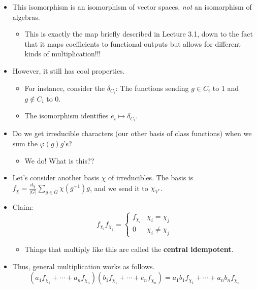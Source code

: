 \documentclass[../notes.tex]{subfiles}
\begin{document}
\begin{itemize}
\begin{itemize}
        \item This isomorphism is an isomorphism of vector spaces, \emph{not} an isomorphism of algebras.
        \begin{itemize}
            \item This is exactly the map briefly described in Lecture 3.1, down to the fact that it maps coefficients to functional outputs but allows for different kinds of multiplication!!!
        \end{itemize}
        \item However, it still has cool properties.
        \begin{itemize}
            \item For instance, consider the $\delta_{C_i}$: The functions sending $g\in C_i$ to 1 and $g\notin C_i$ to 0.
            \item The isomorphism identifies $e_i\mapsto\delta_{C_i}$.
        \end{itemize}
        \item Do we get irreducible characters (our other basis of class functions) when we sum the $\varphi(g)g$'s?
        \begin{itemize}
            \item We do! What is this??
        \end{itemize}
        \item Let's consider another basis $\chi$ of irreducibles. The basis is $f_\chi=\frac{d_\chi}{|G|}\sum_{g\in G}\chi(g^{-1})g$, and we send it to $\chi_{V^*}$.
        \item Claim:
        \begin{equation*}
            f_{\chi_i}f_{\chi_j} =
            \begin{cases}
                f_{\chi_i} & \chi_i=\chi_j\\
                0 & \chi_i\neq\chi_j
            \end{cases}
        \end{equation*}
        \begin{itemize}
            \item Things that multiply like this are called the \textbf{central idempotent}.
        \end{itemize}
        \item Thus, general multiplication works as follows.
        \begin{equation*}
            (a_1f_{\chi_1}+\cdots+a_nf_{\chi_n})(b_1f_{\chi_1}+\cdots+e_nf_{\chi_n}) = a_1b_1f_{\chi_1}+\cdots+a_nb_nf_{\chi_n}

\end{equation*}
\end{itemize}
\end{itemize}
\end{document}
